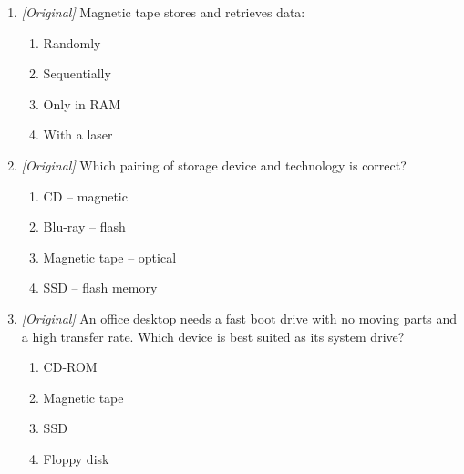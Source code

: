 \begin{enumerate}[label=\textbf{Q\arabic*.}, leftmargin=*]
\begin{enumerate}[label=\Alph*.]
  \end{enumerate}
\item \textit{[Original]} Magnetic tape stores and retrieves data:
  \begin{enumerate}[label=\Alph*.]
    \item Randomly
    \item Sequentially
    \item Only in RAM
    \item With a laser
  \end{enumerate}
\item \textit{[Original]} Which pairing of storage device and technology is
  correct?
  \begin{enumerate}[label=\Alph*.]
    \item CD -- magnetic
    \item Blu-ray -- flash
    \item Magnetic tape -- optical
    \item SSD -- flash memory
  \end{enumerate}
\item \textit{[Original]} An office desktop needs a fast boot drive with no
  moving parts and a high transfer rate. Which device is best suited as its
  system drive?
  \begin{enumerate}[label=\Alph*.]
    \item CD-ROM
    \item Magnetic tape
    \item SSD
    \item Floppy disk
  \end{enumerate}


\end{enumerate}
